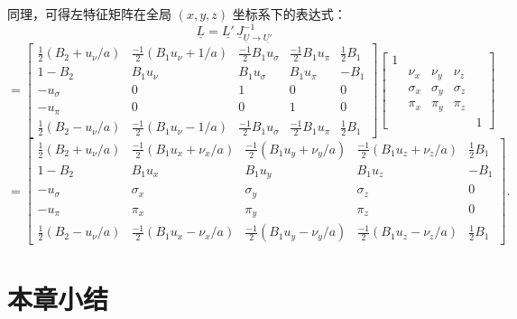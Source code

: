 同理，可得左特征矩阵在全局 $(x,y,z)$ 坐标系下的表达式：
\begin{equation}
\underline{L}=\underline{L'}\,\underline{J}_{\underline{U}\to\underline{U'}}^{-1}
\end{equation}
\begin{equation}
=\begin{bmatrix}\frac{1}{2}\left(B_{2}+u_{\nu}/a\right) & \frac{-1}{2}\left(B_{1}u_{\nu}+1/a\right) & \frac{-1}{2}B_{1}u_{\sigma} & \frac{-1}{2}B_{1}u_{\pi} & \frac{1}{2}B_{1}\\
1-B_{2} & B_{1}u_{\nu} & B_{1}u_{\sigma} & B_{1}u_{\pi} & -B_{1}\\
-u_{\sigma} & 0 & 1 & 0 & 0\\
-u_{\pi} & 0 & 0 & 1 & 0\\
\frac{1}{2}\left(B_{2}-u_{\nu}/a\right) & \frac{-1}{2}\left(B_{1}u_{\nu}-1/a\right) & \frac{-1}{2}B_{1}u_{\sigma} & \frac{-1}{2}B_{1}u_{\pi} & \frac{1}{2}B_{1}
\end{bmatrix}\begin{bmatrix}1\\
 & \nu_{x} & \nu_{y} & \nu_{z}\\
 & \sigma_{x} & \sigma_{y} & \sigma_{z}\\
 & \pi_{x} & \pi_{y} & \pi_{z}\\
 &  &  &  & 1
\end{bmatrix}
\end{equation}
\begin{equation}
=\begin{bmatrix}\frac{1}{2}\left(B_{2}+u_{\nu}/a\right) & \frac{-1}{2}\left(B_{1}u_{x}+\nu_{x}/a\right) & \frac{-1}{2}\left(B_{1}u_{y}+\nu_{y}/a\right) & \frac{-1}{2}\left(B_{1}u_{z}+\nu_{z}/a\right) & \frac{1}{2}B_{1}\\
1-B_{2} & B_{1}u_{x} & B_{1}u_{y} & B_{1}u_{z} & -B_{1}\\
-u_{\sigma} & \sigma_{x} & \sigma_{y} & \sigma_{z} & 0\\
-u_{\pi} & \pi_{x} & \pi_{y} & \pi_{z} & 0\\
\frac{1}{2}\left(B_{2}-u_{\nu}/a\right) & \frac{-1}{2}\left(B_{1}u_{x}-\nu_{x}/a\right) & \frac{-1}{2}\left(B_{1}u_{y}-\nu_{y}/a\right) & \frac{-1}{2}\left(B_{1}u_{z}-\nu_{z}/a\right) & \frac{1}{2}B_{1}
\end{bmatrix}.
\end{equation}


\section{本章小结}

